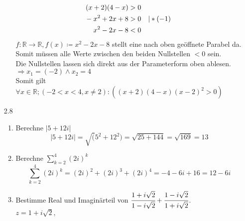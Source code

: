 \documentclass[12pt,letterpaper]{article}
\newcommand{\alignleft}[1]{\tag*{\llap{\makebox[\linewidth][l]{$#1$}}}}
\newcommand{\LLeftrightarrow}{ \alignleft{\Leftrightarrow}}
\newcommand{\eqinfo}[1]{&\makebox[2cm][l]{$\vert #1$}}
\newcommand{\Eqn}[3]{#1 &#2 #3}
\newcommand{\geqnf}[3]{\Eqn{#1}{#2}{#3}\\}
\newcommand{\geqn}[3]{\LLeftrightarrow\Eqn{#1}{#2}{#3}\\}
\newcommand{\geqni}[4]{\LLeftrightarrow\Eqn{#1}{#2}{#3}\eqinfo{#4}\\}
\begin{document}
\begin{enumerate}
\begin{enumerate}
\begin{align*}
\geqnf{(x+2)(4-x)}{>}{0}
\geqni{-x^2+2x+8}{>}{0}{*(-1)}
\geqn{x^2-2x-8}{<}{0}
\end{align*}
$f: \mathbb{R}\to\mathbb{R}, f(x)\coloneqq x^2-2x-8$ stellt eine nach oben geöffnete Parabel da. Somit müssen alle Werte zwischen den beiden Nullstellen $<0$ sein.\\
Die Nullstellen lassen sich direkt aus der Parameterform oben ablesen.\\
$\Rightarrow x_1=(-2) \land x_2=4$\\
Somit gilt $\forall x\in\mathbb{R};(-2<x<4, x\neq 2):(\left(x+2\right)\left(4-x\right)\left(x-2\right)^2>0)$
\end{enumerate}
\item [2.8]
\begin{enumerate}
\item Berechne $|5+12i|$\\
$$|5+12i| = \sqrt(5^2+12^2) = \sqrt{25+144} = \sqrt{169} = 13$$
\item Berechne $\sum\limits_{k=2}^{4}(2i)^k$
$$\sum_{k=2}^{4}(2i)^k = (2i)^2+(2i)^3+(2i)^4 = -4-6i+16 = 12-6i$$
\item Bestimme Real und Imaginärteil von $\cfrac{1+i\sqrt{2}}{1-i\sqrt{2}}+\cfrac{1-i\sqrt{2}}{1+i\sqrt{2}}$.\\
$z = 1+i\sqrt{2}, $

\end{enumerate}
\end{enumerate}
\end{document}
